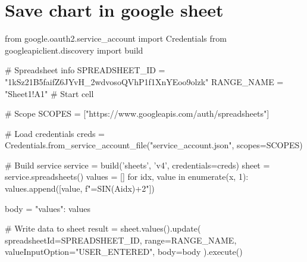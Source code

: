 \documentclass{article}
\begin{document}
\section{Save chart in google sheet}

\begin{pylabblock}
from google.oauth2.service_account import Credentials
from googleapiclient.discovery import build

# Spreadsheet info
SPREADSHEET_ID = "1kSz21B5faifZ6JYvH_2wdvosoQVhP1f1XnYEoo9olzk"
RANGE_NAME = "Sheet1!A1"  # Start cell

# Scope
SCOPES = ["https://www.googleapis.com/auth/spreadsheets"]

# Load credentials
creds = Credentials.from_service_account_file("service_account.json", scopes=SCOPES)

# Build service
service = build('sheets', 'v4', credentials=creds)
sheet = service.spreadsheets()
values = []
for idx, value in enumerate(x, 1):
    values.append([value, f"=SIN(A{idx})+2"])

body = {
    "values": values
}

# Write data to sheet
result = sheet.values().update(
    spreadsheetId=SPREADSHEET_ID,
    range=RANGE_NAME,
    valueInputOption="USER_ENTERED",
    body=body
).execute()
\end{pylabblock}
\end{document}
